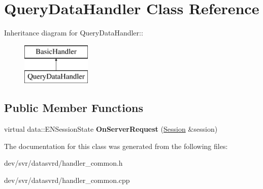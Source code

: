 \hypertarget{classQueryDataHandler}{
\section{QueryDataHandler Class Reference}
\label{classQueryDataHandler}
}
Inheritance diagram for QueryDataHandler::\begin{figure}[H]
\begin{center}
\leavevmode
\includegraphics[height=2cm]{classQueryDataHandler}
\end{center}
\end{figure}
\subsection*{Public Member Functions}
\begin{DoxyCompactItemize}
\item 
\hypertarget{classQueryDataHandler_aa0a6129308ae53defd4e3fb375482286}{
virtual data::ENSessionState {\bfseries OnServerRequest} (\hyperlink{classSession}{Session} \&session)}
\label{classQueryDataHandler_aa0a6129308ae53defd4e3fb375482286}

\end{DoxyCompactItemize}


The documentation for this class was generated from the following files:\begin{DoxyCompactItemize}
\item 
dev/svr/datasvrd/handler\_\-common.h\item 
dev/svr/datasvrd/handler\_\-common.cpp\end{DoxyCompactItemize}
